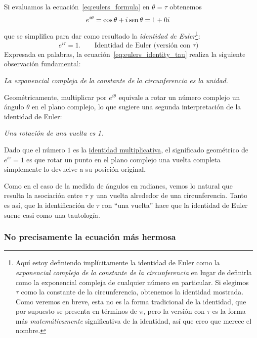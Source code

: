 Si evaluamos la ecuación~\eqref{eq:eulers_formula} en $\theta = \tau$ obtenemos 
\begin{equation}
\label{eq:eulers_identity_tau_0i}
  e^{i\theta} = \cos\theta + i\,\mbox{sen}\,\theta = 1 + 0i\,
\end{equation}
que se simplifica para dar como resultado la \emph{identidad de Euler}\footnote{Aquí estoy definiendo implícitamente la identidad de Euler como la \emph{exponencial compleja de la constante de la circunferencia} en lugar de definirla como la exponencial compleja de cualquier número en particular. Si elegimos  $\tau$ como la constante de la circunferencia, obtenemos la identidad mostrada. Como veremos en breve, esta no es la forma tradicional de la identidad, que por supuesto se presenta en términos de $\pi$, pero la versión con  $\tau$ es la forma más  \emph{matemáticamente} significativa de la identidad, así que creo que merece el nombre.}:
\begin{equation}
\label{eq:eulers_identity_tau}
e^{i\tau} = 1. \qquad\mbox{Identidad de Euler (versión con $\tau$)}
\end{equation}
Expresada en palabras, la ecuación~\eqref{eq:eulers_identity_tau} realiza la siguiente observación fundamental:

\begin{center}
\emph{La exponencial compleja de la constante de la circunferencia es la unidad.} 
\end{center}

Geométricamente, multiplicar por $e^{i\theta}$ equivale a rotar un número complejo un ángulo $\theta$ en el plano complejo, lo que sugiere una segunda interpretación de la identidad de Euler:

\begin{center}
\emph{Una rotación de una vuelta es 1.}
\end{center}


\noindent Dado que el número $1$ es la \href{https://es.wikipedia.org/wiki/Elemento_neutro}{identidad multiplicativa}, el significado geométrico de $e^{i\tau} = 1$ es que rotar un punto en el plano complejo una vuelta completa simplemente lo devuelve a su posición original.

Como en el caso de la medida de ángulos en radianes, vemos lo natural que resulta la asociación entre $\tau$ y una vuelta alrededor de una circunferencia. Tanto es así, que la identificación de $\tau$ con ``una vuelta'' hace que la identidad de Euler suene casi como una tautología.


    \subsubsection{No precisamente la ecuación más hermosa} %
    \label{sec:not_the_most_beautiful_equation}

